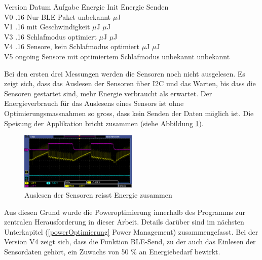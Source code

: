 \begin{minipage}{\textwidth}
\begin{tabbing}
    Version   \quad\= Datum    \quad\= Aufgabe\hphantom{re, kein Schlafmodus optimiert} \quad\= Energie Init    \quad\=  Energie Senden \\[0.8ex]
    V0        .16  \> Nur BLE Paket      \> unbekannt             $\mu$J \\
    V1        .16  \> mit Geschwindigkeit       $\mu$J             $\mu$J \\
    V3        .16   \> Schlafmodus optimiert      $\mu$J             $\mu$J \\
    V4        .16     Sensore, kein Schlafmodus optimiert      $\mu$J             $\mu$J \\
    V5        \> ongoing     Sensore mit optimiertem Schlafmodus     \> unbekannt           \> unbekannt\\
\end{tabbing}
\end{minipage}

Bei den ersten drei Messungen werden die Sensoren noch nicht ausgelesen. Es zeigt sich, dass das Auslesen der Sensoren über I2C und das Warten, bis dass die Sensoren gestartet sind,  mehr Energie verbraucht als erwartet. Der Energieverbrauch für das Auslesens eines Sensors ist ohne Optimierungsmassnahmen so gross, dass kein Senden der Daten möglich ist. Die Speisung der Applikation bricht zusammen (siehe Abbildung \ref{i2c_problem}).

\begin{figure}[ht]
    \includegraphics[width=0.5\textwidth]{3Vorgehen/imag/pic4VSUPbrichtEin.PNG} 
    \caption{Auslesen der Sensoren reisst Energie zusammen}
    \label{i2c_problem}
\end{figure}

Aus diesen Grund wurde die Poweroptimierung innerhalb des Programms zur zentralen Herausforderung in dieser Arbeit. Details darüber sind im nächsten Unterkapitel (\ref{powerOptimierung} Power Management) zusammengefasst. Bei der Version V4 zeigt sich, dass die Funktion BLE-Send, zu der auch das Einlesen der Sensordaten gehört, ein Zuwachs von 50 \% an Energiebedarf bewirkt. 



